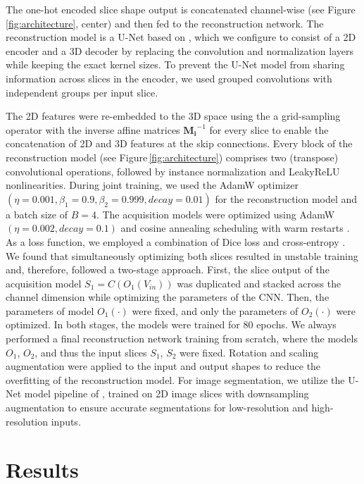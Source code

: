     The one-hot encoded slice shape output is concatenated channel-wise (see Figure\,\ref{fig:architecture}, center)
    and then fed to the reconstruction network.
    The reconstruction model is a U-Net based on \cite{isensee2021nnu}, which we configure to consist of a 2D encoder and a 3D decoder by replacing the convolution and normalization layers while keeping the exact kernel sizes.
    To prevent the U-Net model from sharing information across slices in the encoder, we used grouped convolutions with independent groups per input slice.

    The 2D features were re-embedded to the 3D space using the a grid-sampling operator with the inverse affine matrices $\mathbf{M_i}^{-1}$ for every slice to enable the concatenation of 2D and 3D features at the skip connections.
    Every block of the reconstruction model (see Figure\,\ref{fig:architecture}) comprises two (transpose) convolutional operations, followed by instance normalization and LeakyReLU nonlinearities.
    During joint training, we used the AdamW optimizer \cite{loshchilov2017decoupled} $(\eta=0.001, \beta_1=0.9, \beta_2=0.999, decay=0.01)$ for the reconstruction model and a batch size of $B=4$.
    The acquisition models were optimized using AdamW $(\eta=0.002, decay=0.1)$ and cosine annealing scheduling with warm restarts \cite{loshchilov2016sgdr}.
    As a loss function, we employed a combination of Dice loss and cross-entropy \cite{isensee2021nnu}.
    We found that simultaneously optimizing both slices resulted in unstable training and, therefore, followed a two-stage approach. First, the slice output of the acquisition model $S_1 = C(O_1(V_{in}))$ was duplicated and stacked across the channel dimension while optimizing the parameters of the CNN. Then, the parameters of model $O_1(\cdot)$ were fixed, and only the parameters of $O_2(\cdot)$ were optimized. In both stages, the models were trained for 80 epochs.
    We always performed a final reconstruction network training from scratch, where the models $O_1$, $O_2$, and thus the input slices $S_1$, $S_2$ were fixed.
    Rotation and scaling augmentation were applied to the input and output shapes to reduce the overfitting of the reconstruction model.
    For image segmentation, we utilize the U-Net model pipeline of \cite{isensee2021nnu}, trained on 2D image slices with downsampling augmentation to ensure accurate segmentations for low-resolution and high-resolution inputs.

\section{Results}
